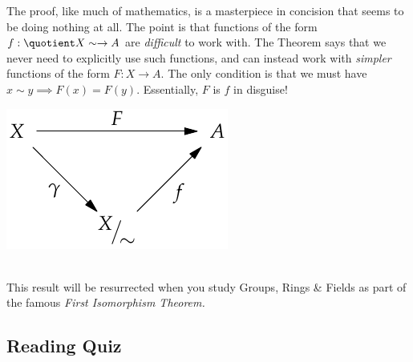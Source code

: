 \noindent\begin{minipage}{0.65\textwidth}
The proof, like much of mathematics, is a masterpiece in concision that seems to be doing nothing at all. The point is that functions of the form $f:\quotient X\sim\to A$ are \emph{difficult} to work with. The Theorem says that we never need to explicitly use such functions, and can instead work with \emph{simpler} functions of the form $F:X\to A$. The only condition is that we must have $x\sim y\implies F(x)=F(y)$. Essentially, $F$ is $f$ in disguise!
\end{minipage}\qquad\begin{minipage}{0.3\textwidth}
\includegraphics[width=\textwidth]{relations-17-isomthm}
\end{minipage}\\[2pt]

This result will be resurrected when you study Groups, Rings \& Fields as part of the famous \emph{First Isomorphism Theorem.}




\subsection*{Reading Quiz}

